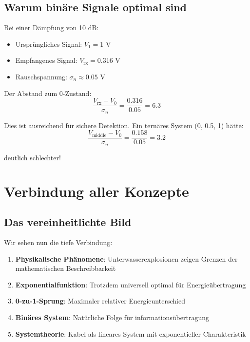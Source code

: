 ﻿\documentclass[12pt,a4paper]{article}
\theoremstyle{definition}
\theoremstyle{remark}
\begin{document}
\subsection{Warum binäre Signale optimal sind}

Bei einer Dämpfung von 10 dB:
\begin{itemize}
\item Ursprüngliches Signal: $V_1 = 1$ V
\item Empfangenes Signal: $V_{\text{rx}} = 0.316$ V
\item Rauschspannung: $\sigma_n \approx 0.05$ V
\end{itemize}

Der Abstand zum 0-Zustand:
\begin{equation}
\frac{V_{\text{rx}} - V_0}{\sigma_n} = \frac{0.316}{0.05} = 6.3
\end{equation}

Dies ist ausreichend für sichere Detektion. Ein ternäres System (0, 0.5, 1) hätte:
\begin{equation}
\frac{V_{\text{middle}} - V_0}{\sigma_n} = \frac{0.158}{0.05} = 3.2
\end{equation}

deutlich schlechter!

\section{Verbindung aller Konzepte}

\subsection{Das vereinheitlichte Bild}

Wir sehen nun die tiefe Verbindung:

\begin{enumerate}
\item \textbf{Physikalische Phänomene}: Unterwasserexplosionen zeigen Grenzen der mathematischen Beschreibbarkeit
\item \textbf{Exponentialfunktion}: Trotzdem universell optimal für Energieübertragung
\item \textbf{0-zu-1-Sprung}: Maximaler relativer Energieunterschied
\item \textbf{Binäres System}: Natürliche Folge für informationsübertragung
\item \textbf{Systemtheorie}: Kabel als lineares System mit exponentieller Charakteristik
\end{enumerate}
\end{document}
